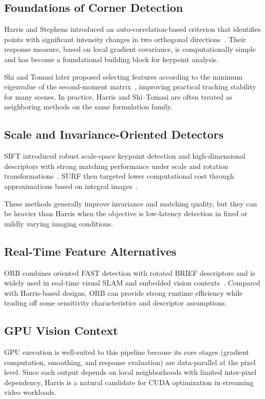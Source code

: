 \documentclass[conference]{IEEEtran}
\begin{document}
\subsection{Foundations of Corner Detection}
Harris and Stephens introduced an auto-correlation-based criterion that identifies points with significant intensity changes in two orthogonal directions~\cite{harris1988}. Their response measure, based on local gradient covariance, is computationally simple and has become a foundational building block for keypoint analysis.

Shi and Tomasi later proposed selecting features according to the minimum eigenvalue of the second-moment matrix~\cite{shi1994}, improving practical tracking stability for many scenes. In practice, Harris and Shi--Tomasi are often treated as neighboring methods on the same formulation family.

\subsection{Scale and Invariance-Oriented Detectors}
SIFT introduced robust scale-space keypoint detection and high-dimensional descriptors with strong matching performance under scale and rotation transformations~\cite{lowe2004}. SURF then targeted lower computational cost through approximations based on integral images~\cite{bay2008}.

These methods generally improve invariance and matching quality, but they can be heavier than Harris when the objective is low-latency detection in fixed or mildly varying imaging conditions.

\subsection{Real-Time Feature Alternatives}
ORB combines oriented FAST detection with rotated BRIEF descriptors and is widely used in real-time visual SLAM and embedded vision contexts~\cite{rublee2011}. Compared with Harris-based designs, ORB can provide strong runtime efficiency while trading off some sensitivity characteristics and descriptor assumptions.

\subsection{GPU Vision Context}
GPU execution is well-suited to this pipeline because its core stages (gradient computation, smoothing, and response evaluation) are data-parallel at the pixel level. Since each output depends on local neighborhoods with limited inter-pixel dependency, Harris is a natural candidate for CUDA optimization in streaming video workloads.
\end{document}
